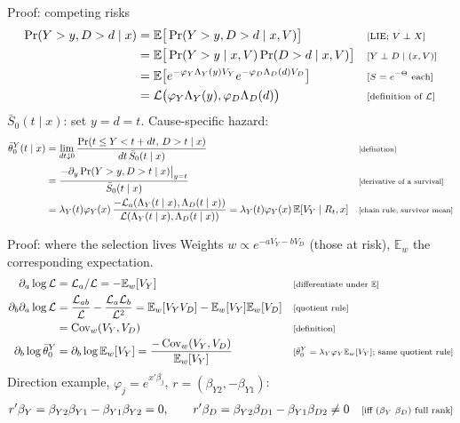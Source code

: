 \documentclass[aspectratio=169,10pt]{beamer}
\newcommand{\E}{\mathbb{E}}
\newcommand{\Lap}{\mathcal{L}}
\newcommand{\cov}{\operatorname{Cov}}
\newcommand{\why}[1]{\text{\scriptsize[#1]}}
\begin{document}
\begin{frame}[label=p-race]{Proof: competing risks}
  \small
  \begin{align*}
    \Pr(Y>y,D>d\mid x) &= \E\big[\Pr(Y>y,D>d\mid x,V)\big] && \why{LIE; $V\perp X$} \\
    &= \E\big[\Pr(Y>y\mid x,V)\Pr(D>d\mid x,V)\big] && \why{$Y\perp D\mid(x,V)$} \\
    &= \E\big[e^{-\varphi_Y\Lambda_Y(y)V_Y}e^{-\varphi_D\Lambda_D(d)V_D}\big] && \why{$S=e^{-\Theta}$ each} \\
    &= \Lap\big(\varphi_Y\Lambda_Y(y),\varphi_D\Lambda_D(d)\big) && \why{definition of $\Lap$}
  \end{align*}
  $\bar S_0(t\mid x)$: set $y=d=t$. Cause-specific hazard:
  \begin{align*}
    \bar\theta^Y_0(t\mid x) &= \lim_{dt\downarrow0}\frac{\Pr(t\le Y<t+dt,\,D>t\mid x)}{dt\,\bar S_0(t\mid x)} && \why{definition} \\
    &= \frac{-\partial_y\Pr(Y>y,D>t\mid x)\big|_{y=t}}{\bar S_0(t\mid x)} && \why{derivative of a survival} \\
    &= \lambda_Y(t)\varphi_Y(x)\,\frac{-\Lap_a(\Lambda_Y(t\mid x),\Lambda_D(t\mid x))}{\Lap(\Lambda_Y(t\mid x),\Lambda_D(t\mid x))} = \lambda_Y(t)\varphi_Y(x)\,\E[V_Y\mid R_t,x] && \why{chain rule; survivor mean}
  \end{align*}
\end{frame}

\begin{frame}[label=p-sel]{Proof: where the selection lives}
  Weights $w\propto e^{-aV_Y-bV_D}$ (those at risk), $\E_w$ the corresponding expectation.
  \begin{align*}
    \partial_a\log\Lap &= \Lap_a/\Lap = -\E_w[V_Y] && \why{differentiate under $\E$} \\
    \partial_b\partial_a\log\Lap &= \frac{\Lap_{ab}}{\Lap}-\frac{\Lap_a\Lap_b}{\Lap^2} = \E_w[V_YV_D]-\E_w[V_Y]\E_w[V_D] && \why{quotient rule} \\
    &= \cov_w(V_Y,V_D) && \why{definition} \\
    \partial_b\log \bar\theta^Y_0 &= \partial_b\log\E_w[V_Y] = \frac{-\cov_w(V_Y,V_D)}{\E_w[V_Y]} && \why{$\bar\theta^Y_0=\lambda_Y\varphi_Y\E_w[V_Y]$; same quotient rule}
  \end{align*}
  Direction example, $\varphi_j=e^{x'\beta_j}$, $r=(\beta_{Y2},-\beta_{Y1})$:
  \begin{align*}
    r'\beta_Y = \beta_{Y2}\beta_{Y1}-\beta_{Y1}\beta_{Y2}=0, \qquad r'\beta_D=\beta_{Y2}\beta_{D1}-\beta_{Y1}\beta_{D2}\neq0 && \why{iff $(\beta_Y\ \beta_D)$ full rank}
  \end{align*}
\end{frame}
\end{document}
